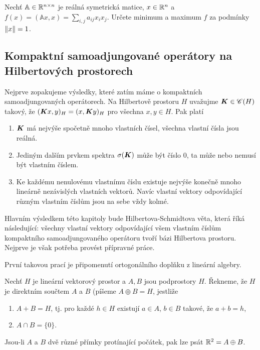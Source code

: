 \begin{exercise}
Nechť $\mathbb{A} \in \mathbb{R}^{n \times n}$ je reálná symetrická matice, $x \in \mathbb{R}^n$ a $f(x) = (\mathbb{A} x,x) = \sum_{i,j} a_{ij} x_i x_j$. Určete minimum a maximum $f$ za podmínky $\left\lVert x\right\rVert =1$.
\end{exercise}

\subsection{Kompaktní samoadjungované operátory na Hilbertových prostorech}

Nejprve zopakujeme výsledky, které zatím máme o kompaktních samoadjungovaných operátorech. Na Hilbertově prostoru $H$ uvažujme $\boldsymbol{K} \in \mathscr{C} (H)$ takový, že $(\boldsymbol{K} x,y)_H = (x, \boldsymbol{K} y)_H$ pro všechna $x,y \in H$. Pak platí \begin{enumerate}
    \item $\boldsymbol{K}$ má nejvýše spočetně mnoho vlastních čísel, všechna vlastní čísla jsou reálná.
    \item Jediným dalším prvkem spektra $\sigma(\boldsymbol{K})$ může být číslo $0$, ta může nebo nemusí být vlastním číslem.
    \item Ke každému nenulovému vlastnímu číslu existuje nejvýše konečně mnoho lineárně nezávislých vlastních vektorů. Navíc vlastní vektory odpovídající různým vlastním číslům jsou na sebe vždy kolmé.
\end{enumerate}

Hlavním výsledkem této kapitoly bude Hilbertova-Schmidtova věta, která říká následující: všechny vlastní vektory odpovídající všem vlastním číslům kompaktního samoadjungovaného operátoru tvoří bázi Hilbertova prostoru. Nejprve je však potřeba provést přípravné práce.

První takovou prací je připomenutí ortogonálního doplňku z lineární algebry.
\begin{definition}
Nechť $H$ je lineární vektorový prostor a $A,B$ jsou podprostory $H$. Řekneme, že $H$ je direktním součtem $A$ a $B$ (píšeme $A \oplus B = H$, jestliže \begin{enumerate}
    \item $A+B=H$, tj. pro každé $h \in H$ existují $a \in A$, $b \in B$ takové, že $a+b=h$,
    \item $A \cap B = \{0 \}$.
\end{enumerate}
\end{definition}

\begin{example}
Jsou-li $A$ a $B$ dvě různé přímky protínající počátek, pak lze psát $\mathbb{R}^2 = A \oplus B$.
\end{example}

